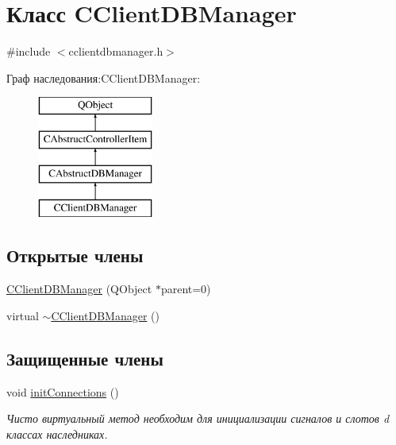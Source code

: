 \hypertarget{class_c_client_d_b_manager}{}\section{Класс C\+Client\+D\+B\+Manager}
\label{class_c_client_d_b_manager}


{\ttfamily \#include $<$cclientdbmanager.\+h$>$}

Граф наследования\+:C\+Client\+D\+B\+Manager\+:\begin{figure}[H]
\begin{center}
\leavevmode
\includegraphics[height=4.000000cm]{class_c_client_d_b_manager}
\end{center}
\end{figure}
\subsection*{Открытые члены}
\begin{DoxyCompactItemize}
\item 
\hyperlink{class_c_client_d_b_manager_aaac2c483f7a445d8565a6dd35f1a77b9}{C\+Client\+D\+B\+Manager} (Q\+Object $\ast$parent=0)
\item 
virtual \hyperlink{class_c_client_d_b_manager_a93ee522535ebb3bcba938b251ee9fa1b}{$\sim$\+C\+Client\+D\+B\+Manager} ()
\end{DoxyCompactItemize}
\subsection*{Защищенные члены}
\begin{DoxyCompactItemize}
\item 
void \hyperlink{class_c_client_d_b_manager_a85d962d6f61d8f9480b6bc9a7f121204}{init\+Connections} ()
\begin{DoxyCompactList}\small\item\em Чисто виртуальный метод необходим для инициализации сигналов и слотов d классах наследниках. \end{DoxyCompactList}\end{DoxyCompactItemize}
